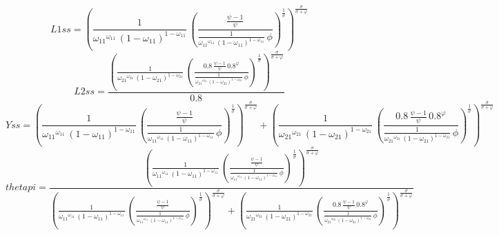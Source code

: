 \begin{dmath*}
L1ss = \left(\frac{1}{{{\omega_{11}}}^{{{\omega_{11}}}}\, \left(1-{{\omega_{11}}}\right)^{1-{{\omega_{11}}}}}\, \left(\frac{\frac{{{\psi}}-1}{{{\psi}}}}{\frac{1}{{{\omega_{11}}}^{{{\omega_{11}}}}\, \left(1-{{\omega_{11}}}\right)^{1-{{\omega_{11}}}}}\, {{\phi}}}\right)^{\frac{1}{{{\sigma}}}}\right)^{\frac{{{\sigma}}}{{{\sigma}}+{{\varphi}}}}
\end{dmath*}
\begin{dmath*}
L2ss = \frac{\left(\frac{1}{{{\omega_{21}}}^{{{\omega_{21}}}}\, \left(1-{{\omega_{21}}}\right)^{1-{{\omega_{21}}}}}\, \left(\frac{0.8\, \frac{{{\psi}}-1}{{{\psi}}}\, 0.8^{{{\varphi}}}}{\frac{1}{{{\omega_{21}}}^{{{\omega_{21}}}}\, \left(1-{{\omega_{21}}}\right)^{1-{{\omega_{21}}}}}\, {{\phi}}}\right)^{\frac{1}{{{\sigma}}}}\right)^{\frac{{{\sigma}}}{{{\sigma}}+{{\varphi}}}}}{0.8}
\end{dmath*}
\begin{dmath*}
Yss = \left(\frac{1}{{{\omega_{11}}}^{{{\omega_{11}}}}\, \left(1-{{\omega_{11}}}\right)^{1-{{\omega_{11}}}}}\, \left(\frac{\frac{{{\psi}}-1}{{{\psi}}}}{\frac{1}{{{\omega_{11}}}^{{{\omega_{11}}}}\, \left(1-{{\omega_{11}}}\right)^{1-{{\omega_{11}}}}}\, {{\phi}}}\right)^{\frac{1}{{{\sigma}}}}\right)^{\frac{{{\sigma}}}{{{\sigma}}+{{\varphi}}}}+\left(\frac{1}{{{\omega_{21}}}^{{{\omega_{21}}}}\, \left(1-{{\omega_{21}}}\right)^{1-{{\omega_{21}}}}}\, \left(\frac{0.8\, \frac{{{\psi}}-1}{{{\psi}}}\, 0.8^{{{\varphi}}}}{\frac{1}{{{\omega_{21}}}^{{{\omega_{21}}}}\, \left(1-{{\omega_{21}}}\right)^{1-{{\omega_{21}}}}}\, {{\phi}}}\right)^{\frac{1}{{{\sigma}}}}\right)^{\frac{{{\sigma}}}{{{\sigma}}+{{\varphi}}}}
\end{dmath*}
\begin{dmath*}
thetapi = \frac{\left(\frac{1}{{{\omega_{11}}}^{{{\omega_{11}}}}\, \left(1-{{\omega_{11}}}\right)^{1-{{\omega_{11}}}}}\, \left(\frac{\frac{{{\psi}}-1}{{{\psi}}}}{\frac{1}{{{\omega_{11}}}^{{{\omega_{11}}}}\, \left(1-{{\omega_{11}}}\right)^{1-{{\omega_{11}}}}}\, {{\phi}}}\right)^{\frac{1}{{{\sigma}}}}\right)^{\frac{{{\sigma}}}{{{\sigma}}+{{\varphi}}}}}{\left(\frac{1}{{{\omega_{11}}}^{{{\omega_{11}}}}\, \left(1-{{\omega_{11}}}\right)^{1-{{\omega_{11}}}}}\, \left(\frac{\frac{{{\psi}}-1}{{{\psi}}}}{\frac{1}{{{\omega_{11}}}^{{{\omega_{11}}}}\, \left(1-{{\omega_{11}}}\right)^{1-{{\omega_{11}}}}}\, {{\phi}}}\right)^{\frac{1}{{{\sigma}}}}\right)^{\frac{{{\sigma}}}{{{\sigma}}+{{\varphi}}}}+\left(\frac{1}{{{\omega_{21}}}^{{{\omega_{21}}}}\, \left(1-{{\omega_{21}}}\right)^{1-{{\omega_{21}}}}}\, \left(\frac{0.8\, \frac{{{\psi}}-1}{{{\psi}}}\, 0.8^{{{\varphi}}}}{\frac{1}{{{\omega_{21}}}^{{{\omega_{21}}}}\, \left(1-{{\omega_{21}}}\right)^{1-{{\omega_{21}}}}}\, {{\phi}}}\right)^{\frac{1}{{{\sigma}}}}\right)^{\frac{{{\sigma}}}{{{\sigma}}+{{\varphi}}}}}
\end{dmath*}

